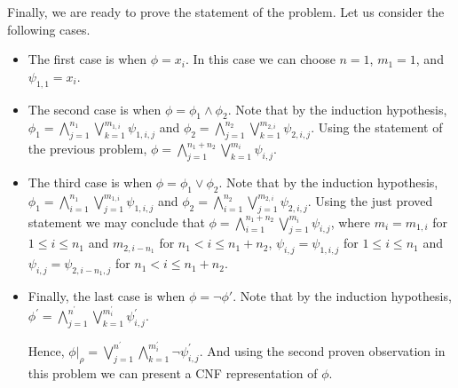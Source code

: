 \documentclass[addpoints]{exam}
\begin{document}
\begin{questions}
\begin{parts}
\begin{solution}[\stretch{1}]
Finally, we are ready to prove the statement of the problem.
Let us consider the following cases.
\begin{itemize}
    \item The first case is when $\phi = x_i$. In this case we can choose
        $n = 1$, $m_1 = 1$, and $\psi_{1, 1} = x_i$.
    \item The second case is when $\phi = \phi_1 \land \phi_2$.
        Note that by the induction hypothesis,
        $\phi_1 = \bigwedge_{j = 1}^{n_1} \bigvee_{k = 1}^{m_{1, i}} \psi_{1, i, j}$
        and
        $\phi_2 = \bigwedge_{j = 1}^{n_2} \bigvee_{k = 1}^{m_{2, i}} \psi_{2, i, j}$.
        Using the statement of the previous problem,
        $\phi = \bigwedge_{j = 1}^{n_1 + n_2} \bigvee_{k = 1}^{m_i} \psi_{i, j}$.
    \item The third case is when $\phi = \phi_1 \lor \phi_2$.
        Note that by the induction hypothesis,
        $\phi_1 = \bigwedge_{i = 1}^{n_1} \bigvee_{j = 1}^{m_{1, i}} \psi_{1, i, j}$
        and
        $\phi_2 = \bigwedge_{i = 1}^{n_2} \bigvee_{j = 1}^{m_{2, i}} \psi_{2, i, j}$.
        Using the just proved statement we may conclude that
        $\phi =
          \bigwedge_{i = 1}^{n_1 + n_2} \bigvee_{j = 1}^{m_i} \psi_{i, j}$,
        where $m_i = m_{1, i}$ for $1 \le i \le n_1$ and $m_{2, i - n_1}$ for
        $n_1 < i \le n_1 + n_2$, $\psi_{i, j} = \psi_{1, i, j}$ for
        $1 \le i \le n_1$ and $\psi_{i, j} = \psi_{2, i - n_1, j}$ for
        $n_1 < i \le n_1 + n_2$.
    \item Finally, the last case is when $\phi = \lnot \phi'$.
        Note that by the induction hypothesis,
        $\phi^\prime =
          \bigwedge_{j = 1}^{n^\prime}
            \bigvee_{k = 1}^{m^\prime_i} \psi^\prime_{i, j}$.

        Hence, $\phi\rvert_\rho =
          \bigvee_{j = 1}^{n^\prime}
            \bigwedge_{k = 1}^{m^\prime_i} \lnot \psi^\prime_{i, j}$.
        And using the second proven observation in this problem we can present
        a CNF representation of $\phi$. 
\end{itemize}
            \end{solution}
      \end{parts}
      \newpage
  \end{questions}
\end{document}
